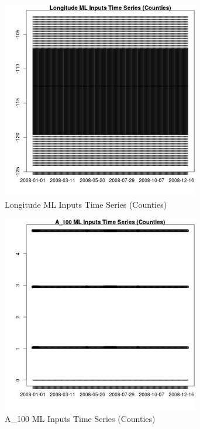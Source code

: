 \begin{figure} 
\centering  
\includegraphics[width=0.77\textwidth]{Code_Outputs/ML_input_report_ML_input_CountyGeometricCentroids_Locations_Dates_part_c_2008-01-01to2008-12-31_LongitudeTS.jpg} 
\caption{\label{fig:ML_input_report_ML_input_CountyGeometricCentroids_Locations_Dates_part_c_2008-01-01to2008-12-31LongitudeTS}Longitude ML Inputs Time Series (Counties)} 
\end{figure} 
 

\begin{figure} 
\centering  
\includegraphics[width=0.77\textwidth]{Code_Outputs/ML_input_report_ML_input_CountyGeometricCentroids_Locations_Dates_part_c_2008-01-01to2008-12-31_A_100TS.jpg} 
\caption{\label{fig:ML_input_report_ML_input_CountyGeometricCentroids_Locations_Dates_part_c_2008-01-01to2008-12-31A_100TS}A_100 ML Inputs Time Series (Counties)} 
\end{figure} 
 

